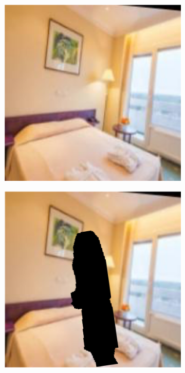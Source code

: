 \begin{figure}
\begin{subfigure}[b]{.19\columnwidth}
        \caption{}
    \end{subfigure}
    \begin{subfigure}[b]{.19\columnwidth}
        \centering
        \includegraphics[width=.98\columnwidth]{figures/chapter4/data_augmentation/3.png}
        \caption{}
    \end{subfigure}
    \begin{subfigure}[b]{.19\columnwidth}
        \centering
        \includegraphics[width=.98\columnwidth]{figures/chapter4/data_augmentation/4.png}

\end{subfigure}
\end{figure}
